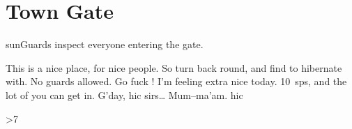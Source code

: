 \section*{Town Gate \hint{\showCycle}}

\begin{multicols}{2}

{\sffamily \Glspl{sunGuard} inspect everyone entering the gate.}

\begin{exampletext}
\ifcase\value{temperature}
  This is a nice place, for nice people.
  So turn back round, and find  to hibernate with.
\or
  No \glspl{guard} allowed.
  Go fuck !
\or
  I'm feeling extra nice today.
  10~\glspl{sp}, and the lot of you can get in.
\else
  G'day, {\tiny hic} sirs\ldots
  Mum--ma'am.
  {\tiny hic}
\fi
\end{exampletext}

\townArmoury

\townDocks

\townWeavers

\townHealers

\townTanner

\townGuardArms

\fightAdvert

\end{multicols}

\townGuardProjectiles

\bigLine

\begin{multicols}{3}

\docksNote

\townCuriosity

\rotatebox{\value{rn1t2}}{\townSignage}

\townBeasts

\townSquare

\innOne

\tavernOne

\tavernTwo

\innTwo

\townPitOfJustice

\randomize
\ifnum\value{r12}>7
\fi

\end{multicols}

